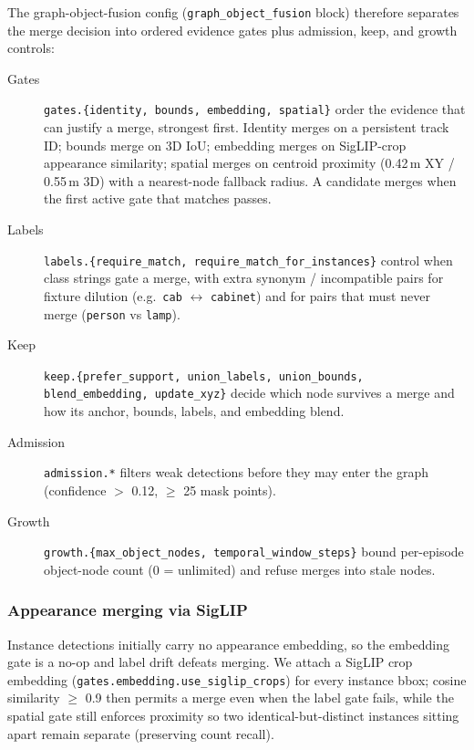 The graph-object-fusion config (\texttt{graph\_object\_fusion} block) therefore
separates the merge decision into ordered evidence gates plus admission, keep, and
growth controls:

\begin{description}
  \item[Gates] \texttt{gates.\{identity, bounds, embedding, spatial\}} order the
    evidence that can justify a merge, strongest first. Identity merges on a
    persistent track ID; bounds merge on 3D IoU; embedding merges on SigLIP-crop
    appearance similarity; spatial merges on centroid proximity (0.42\,m XY /
    0.55\,m 3D) with a nearest-node fallback radius. A candidate merges when the first
    active gate that matches passes.
  \item[Labels] \texttt{labels.\{require\_match, require\_match\_for\_instances\}}
    control when class strings gate a merge, with extra synonym / incompatible pairs
    for fixture dilution (e.g.\ \texttt{cab} $\leftrightarrow$ \texttt{cabinet}) and
    for pairs that must never merge (\texttt{person} vs \texttt{lamp}).
  \item[Keep] \texttt{keep.\{prefer\_support, union\_labels, union\_bounds,
    blend\_embedding, update\_xyz\}} decide which node survives a merge and how its
    anchor, bounds, labels, and embedding blend.
  \item[Admission] \texttt{admission.*} filters weak detections before they may
    enter the graph (confidence $>$ 0.12, $\geq$ 25 mask points).
  \item[Growth] \texttt{growth.\{max\_object\_nodes, temporal\_window\_steps\}} bound
    per-episode object-node count (0 = unlimited) and refuse merges into stale nodes.
\end{description}

\subsubsection{Appearance merging via SigLIP}

Instance detections initially carry no appearance embedding, so the embedding gate is
a no-op and label drift defeats merging. We attach a SigLIP crop embedding
(\texttt{gates.embedding.use\_siglip\_crops}) for every instance bbox; cosine
similarity $\geq$ 0.9 then permits a merge even when the label gate fails, while the
spatial gate still enforces proximity so two identical-but-distinct instances sitting
apart remain separate (preserving count recall).

